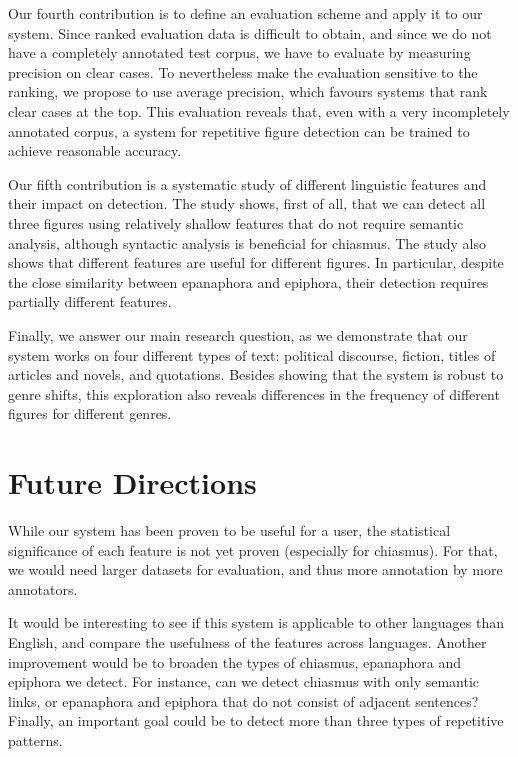 Our fourth contribution is to define an evaluation scheme and apply it to our system. Since ranked evaluation data is difficult to obtain, and since we do not have a completely annotated
test corpus, we have to evaluate by measuring precision on clear cases. To nevertheless make the 
evaluation sensitive to the ranking, we propose to use average precision, which favours systems that
rank clear cases at the top.
This evaluation reveals that, even with a very incompletely annotated corpus, a system for repetitive figure detection can be trained to achieve reasonable accuracy. 

Our fifth contribution is a systematic study of different linguistic features and their impact on detection. The study shows, first of all, that we can detect all three figures using relatively shallow features that do not require semantic analysis, although syntactic analysis is 
beneficial for chiasmus. The study also shows that different features are useful for different figures. In particular, despite the close similarity between epanaphora and epiphora, their detection
requires partially different features.

Finally, we answer our main research question, as we demonstrate that our system works on four different types of text: political discourse, fiction, titles of articles and novels, and quotations. Besides showing that the system is robust to genre shifts, this exploration also reveals differences in the frequency of different figures for different genres.

\section{Future Directions}
 While our system has been proven to be useful for a user, the statistical significance of each feature is not yet proven (especially for chiasmus). For that, we would need larger datasets for evaluation, and thus more annotation by more annotators. 
 
 
 It would be interesting to see if this system is applicable to other languages than English, and compare the usefulness of the features across languages. Another improvement would be to broaden the types of chiasmus, epanaphora and epiphora we detect. For instance, can we detect chiasmus with only semantic links, or epanaphora and epiphora that do not consist of adjacent sentences? Finally, an important goal could be to detect more than three types of repetitive patterns.
 
